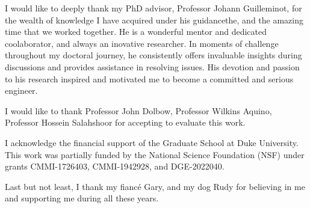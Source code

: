 \acknowledgements

I would like to deeply thank my PhD advisor, Professor Johann Guilleminot, for the wealth of knowledge I have acquired under his guidancethe, and the amazing time that we worked together. He is a wonderful mentor and dedicated coolaborator, and always an inovative researcher. In moments of challenge throughout my doctoral journey, he consistently offers invaluable insights during discussions and provides assistance in resolving issues. His devotion and passion to his research inspired and motivated me to become a committed and serious engineer.

I would like to thank Professor John Dolbow, Professor Wilkins Aquino, Professor Hossein Salahshoor for accepting to evaluate this work.

I acknowledge the financial support of the Graduate School at Duke University. This work was partially funded by the National Science Foundation (NSF) under grants CMMI-1726403, CMMI-1942928, and DGE-2022040.

Last but not least, I thank my fiancé Gary, and my dog Rudy for believing in me and supporting me during all these years.